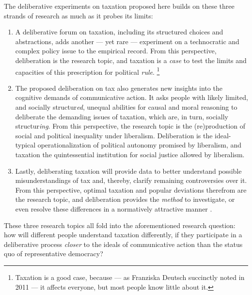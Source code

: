 
The deliberative experiments on taxation proposed here builds on these three strands of research as much as it probes its limits:

\begin{enumerate}
	\item A deliberative forum on taxation, including its structured choices and abstractions, adds another --- yet rare --- experiment on a technocratic and complex policy issue to the empirical record.
	From this perspective, deliberation is the research topic, and taxation is a \emph{case} to test the limits and capacities of this prescription for political \emph{rule}.
	\footnote{
		Taxation is a good case, because --- as Franziska Deutsch succinctly noted in 2011 --- it affects everyone, but most people know little about it.
	}

	\item The proposed deliberation on tax also generates new insights into the cognitive demands of communicative action.
	It asks people with likely limited, and socially structur\emph{ed}, unequal abilities for causal and moral reasoning to deliberate the demanding issues of taxation, which are, in turn, socially structur\emph{ing}.
	From this perspective, the research topic is the (re)production of social and political inequality under liberalism.
	Deliberation is the ideal-typical operationalization of political autonomy promised by liberalism, and taxation the quintessential institution for social justice allowed by liberalism.

	\item Lastly, deliberating taxation will provide data to better understand possible misunderstandings of tax and, thereby, clarify remaining controversies over it.
	From this perspective, optimal taxation and popular deviations therefrom are the research topic, and deliberation provides the \emph{method} to investigate, or even resolve these differences in a normatively attractive manner \citep{Rawls-1971,Habermas-1984}.
\end{enumerate}


These three research topics all fold into the aforementioned research question:
how will different people understand taxation differently, if they participate in a deliberative process \emph{closer} to the ideals of communicative action than the status quo of representative democracy?

